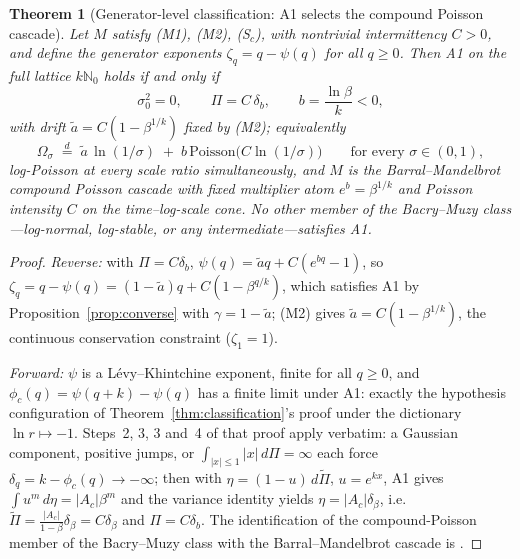\documentclass[pdflatex,sn-mathphys-num]{sn-jnl}
\theoremstyle{thmstyleone}
\newtheorem{theorem}{Theorem}
\theoremstyle{thmstyletwo}
\theoremstyle{thmstylethree}
\begin{document}
\begin{theorem}[Generator-level classification: A1 selects the
compound Poisson cascade]\label{thm:cpc}
Let $M$ satisfy \textup{(M1)}, \textup{(M2)}, \textup{(S$_c$)}, with
nontrivial intermittency $C > 0$, and define the generator
exponents $\zeta_q = q - \psi(q)$ for all $q \ge 0$.  Then A1 on the
full lattice $k\mathbb{N}_0$ holds if and only if
\[
  \sigma_0^2 = 0, \qquad \Pi = C\,\delta_b, \qquad
  b = \frac{\ln\beta}{k} < 0,
\]
with drift $\tilde a = C(1-\beta^{1/k})$ fixed by \textup{(M2)};
equivalently
\[
  \Omega_\sigma \;\stackrel{d}{=}\;
  \tilde a\,\ln(1/\sigma) \;+\; b\,\mathrm{Poisson}\bigl(C
  \ln(1/\sigma)\bigr)
  \qquad\text{for every } \sigma \in (0,1),
\]
log-Poisson at every scale ratio simultaneously, and $M$ is the
Barral--Mandelbrot compound Poisson cascade \cite{BM02} with fixed
multiplier atom $e^b = \beta^{1/k}$ and Poisson intensity $C$ on the
time--log-scale cone.  No other member of the Bacry--Muzy
class---log-normal, log-stable, or any intermediate---satisfies A1.
\end{theorem}

\begin{proof}
\textit{Reverse:}  with $\Pi = C\delta_b$, $\psi(q) = \tilde aq +
C(e^{bq}-1)$, so $\zeta_q = q - \psi(q) = (1-\tilde a)q +
C(1-\beta^{q/k})$, which satisfies A1 by
Proposition~\ref{prop:converse} with $\gamma = 1 - \tilde a$; (M2)
gives $\tilde a = C(1-\beta^{1/k})$, the continuous conservation
constraint ($\zeta_1 = 1$).

\textit{Forward:}  $\psi$ is a L\'evy--Khintchine exponent, finite
for all $q \ge 0$, and $\phi_c(q) = \psi(q+k)-\psi(q)$ has a finite
limit under A1: exactly the hypothesis configuration of
Theorem~\ref{thm:classification}'s proof under the dictionary
$\ln r \mapsto -1$.  Steps~2, 3, 3\textonehalf{} and~4 of that proof
apply verbatim: a Gaussian component, positive jumps, or
$\int_{|x|\le1}|x|\,d\Pi = \infty$ each force $\delta_q = k -
\phi_c(q) \to -\infty$; then with $\eta = (1-u)\,d\tilde\Pi$,
$u = e^{kx}$, A1 gives $\int u^m\,d\eta = |A_c|\beta^m$ and the
variance identity yields $\eta = |A_c|\delta_\beta$, i.e.\
$\tilde\Pi = \frac{|A_c|}{1-\beta}\delta_\beta = C\delta_\beta$ and
$\Pi = C\delta_b$.  The identification of the compound-Poisson
member of the Bacry--Muzy class with the Barral--Mandelbrot cascade
is \cite{BM03}.
\end{proof}
\end{document}
